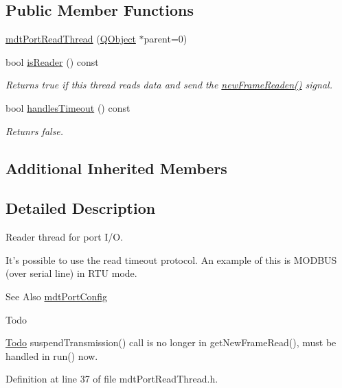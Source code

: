 \subsection*{Public Member Functions}
\begin{DoxyCompactItemize}
\item 
\hyperlink{classmdt_port_read_thread_a180074c2ff60f5103d7e3aa27c1cdb01}{mdt\-Port\-Read\-Thread} (\hyperlink{class_q_object}{Q\-Object} $\ast$parent=0)
\item 
bool \hyperlink{classmdt_port_read_thread_a0138d613b61056c9f8373331de2d9a84}{is\-Reader} () const 
\begin{DoxyCompactList}\small\item\em Returns true if this thread reads data and send the \hyperlink{classmdt_port_thread_a7fc2245c753fd65e1beffec211c41461}{new\-Frame\-Readen()} signal. \end{DoxyCompactList}\item 
bool \hyperlink{classmdt_port_read_thread_afa42f86f3fed878b8f44cacb3a2f41af}{handles\-Timeout} () const 
\begin{DoxyCompactList}\small\item\em Retunrs false. \end{DoxyCompactList}\end{DoxyCompactItemize}
\subsection*{Additional Inherited Members}


\subsection{Detailed Description}
Reader thread for port I/\-O. 

It's possible to use the read timeout protocol. An example of this is M\-O\-D\-B\-U\-S (over serial line) in R\-T\-U mode.

\begin{DoxySeeAlso}{See Also}
\hyperlink{classmdt_port_config}{mdt\-Port\-Config}
\end{DoxySeeAlso}
\begin{DoxyRefDesc}{Todo}
\item[\hyperlink{todo__todo000029}{Todo}]suspend\-Transmission() call is no longer in get\-New\-Frame\-Read(), must be handled in run() now. \end{DoxyRefDesc}


Definition at line 37 of file mdt\-Port\-Read\-Thread.\-h.



